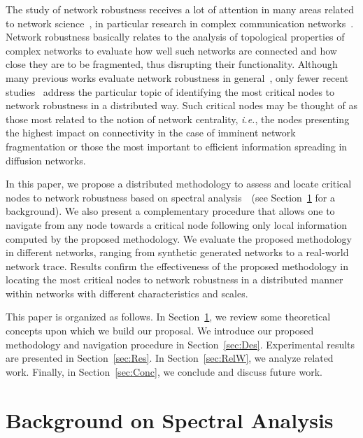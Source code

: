 \documentclass[conference,fleqn]{IEEEtran}
\begin{document}
The study of network robustness receives a lot of attention in many areas related to network science~\cite{Lewis2009a,Kocarev2010}, in particular
research in complex communication networks~\cite{Albert2000a,Newman2000,Cohen2000,Kim2004,Mihail2006a,Xiao2008,Yan2010}.
Network robustness basically 
relates to the analysis of topological properties of complex networks to evaluate how well such networks are connected and 
how close they are to be fragmented, thus disrupting their functionality. Although many previous works evaluate network robustness
in general~\cite{Albert2000a,Newman2000,Cohen2000,Kim2004,Mihail2006a,Xiao2008,Yan2010}, only fewer recent studies~\cite{Nanda2008,Kermarrec2011,Dinh2010} address the particular topic of identifying the most critical nodes to network robustness in a distributed way. 
Such critical nodes may be thought of as those most related to the notion of network centrality, \textit{i.e.}, the nodes presenting 
the highest impact on connectivity in the case of imminent network fragmentation or those
the most important to efficient information spreading in diffusion networks.

In this paper, we propose a distributed methodology to assess and locate critical nodes to network robustness based on
spectral analysis~\cite{Mohar1991,Chung1997,Spielman2010}~(see Section~\ref{sec:Bkg} for a background). We also present a complementary procedure that allows one to navigate from any node towards
a critical node following only local information computed by the proposed methodology. 
We evaluate the proposed methodology in different networks, ranging from synthetic generated 
networks to a real-world network trace. Results confirm the effectiveness of the proposed
methodology in locating the most critical nodes to network robustness in a distributed manner
within networks with different characteristics and scales. 

This paper is organized as follows. In Section~\ref{sec:Bkg}, we review some theoretical concepts upon which we build our proposal. 
We introduce our proposed methodology and navigation procedure in Section~\ref{sec:Des}. Experimental results are presented in Section~\ref{sec:Res}. In Section~\ref{sec:RelW}, we
analyze related work. Finally, in Section~\ref{sec:Conc}, we conclude and discuss future work.

\section{Background on Spectral Analysis}
\label{sec:Bkg}
\end{document}

